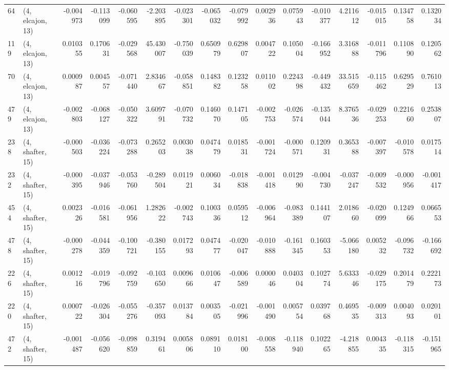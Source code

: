 \begin{tabular}{llrrrrrrrrrrrrrr}
64  &  (4, elcajon, 13) &  -0.004973 & -0.113099 & -0.060595 &   -2.203895 & -0.023301 &  -0.065032 & -0.079992 &  0.002936 &  0.075943 & -0.010377 &    4.211612 & -0.015015 &  0.134758 &  0.132034 \\
119 &  (4, elcajon, 13) &   0.010355 &  0.170631 & -0.029568 &   45.430007 & -0.750039 &   0.650979 &  0.629807 &  0.004722 &  0.105004 & -0.166952 &    3.316888 & -0.011796 &  0.110890 &  0.120562 \\
70  &  (4, elcajon, 13) &   0.000987 &  0.004557 & -0.071440 &    2.834667 & -0.058851 &   0.148382 &  0.123258 &  0.011002 &  0.224398 & -0.449432 &   33.515659 & -0.115462 &  0.629529 &  0.761013 \\
479 &  (4, elcajon, 13) &  -0.002803 & -0.068127 & -0.050322 &    3.609791 & -0.070732 &   0.146070 &  0.147105 & -0.002753 & -0.026574 & -0.135044 &    8.376536 & -0.029253 &  0.221660 &  0.253807 \\
238 &  (4, shafter, 15) &  -0.000503 & -0.036224 & -0.073288 &    0.265203 &  0.003038 &   0.047479 &  0.018531 & -0.001724 & -0.000571 &  0.120931 &    0.365388 & -0.007397 & -0.010578 &  0.017514 \\
232 &  (4, shafter, 15) &  -0.000395 & -0.037946 & -0.053760 &   -0.289504 &  0.011921 &   0.006034 & -0.018838 & -0.001418 &  0.012990 & -0.004730 &   -0.037247 & -0.009532 & -0.000956 & -0.001417 \\
454 &  (4, shafter, 15) &   0.002326 & -0.016581 & -0.061956 &    1.282622 & -0.002743 &   0.100336 &  0.059512 & -0.006964 & -0.083389 &  0.144107 &    2.018660 & -0.020099 &  0.124966 &  0.066553 \\
478 &  (4, shafter, 15) &  -0.000278 & -0.044359 & -0.100721 &   -0.380155 &  0.017293 &   0.047477 & -0.020047 & -0.010888 & -0.161345 &  0.160353 &   -5.066180 &  0.005232 & -0.096732 & -0.166692 \\
226 &  (4, shafter, 15) &   0.001216 & -0.019796 & -0.092759 &   -0.103650 &  0.009666 &   0.010647 & -0.006589 &  0.000046 &  0.040304 &  0.102774 &    5.633346 & -0.029175 &  0.201479 &  0.222173 \\
220 &  (4, shafter, 15) &   0.000722 & -0.026304 & -0.055276 &   -0.357093 &  0.013784 &   0.003505 & -0.021996 & -0.001490 &  0.005754 &  0.039768 &    0.469535 & -0.009313 &  0.004093 &  0.020101 \\
472 &  (4, shafter, 15) &  -0.001487 & -0.056620 & -0.098859 &    0.319461 &  0.005806 &   0.089110 &  0.018100 & -0.008558 & -0.118940 &  0.102265 &   -4.218855 &  0.004335 & -0.118315 & -0.151965 \\

\end{tabular}
